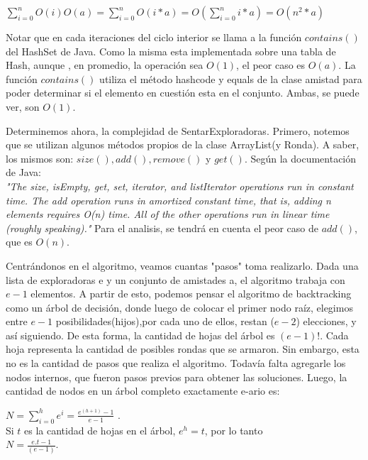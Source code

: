 \documentclass[10pt, a4paper]{article}
\begin{document}
\hspace{30mm}$\sum\limits_{i=0}^n O(i)O(a) =  \sum\limits_{i=0}^n O(i*a) = O(\sum\limits_{i=0}^n i*a) = O(n^2*a)$ 

Notar que en cada iteraciones del ciclo interior se llama a la función $contains()$ del HashSet de Java. Como la misma esta implementada sobre una tabla de Hash, aunque , en promedio, la operación sea $O(1)$, el peor caso es $O(a)$. La función $contains()$ utiliza el método hashcode y equals de la clase amistad para poder determinar si el elemento en cuestión esta en el conjunto. Ambas, se puede ver, son $O(1)$.


Determinemos ahora, la complejidad de SentarExploradoras.
Primero, notemos que se utilizan algunos métodos propios de la clase ArrayList(y Ronda). A saber, los mismos son: $size(),add(),remove()$ y $get()$. Según la documentación de Java:\\

\textit{"The size, isEmpty, get, set, iterator, and listIterator operations run in constant time. The add operation runs in amortized constant time, that is, adding n elements requires O(n) time. All of the other operations run in linear time (roughly speaking)."} Para el analisis, se tendrá en cuenta el peor caso de $add()$, que es $O(n)$.

Centrándonos en el algoritmo, veamos cuantas "pasos" toma realizarlo.  Dada una lista de exploradoras e y un conjunto de amistades a, el algoritmo trabaja con $e-1$ elementos. A partir de esto, podemos pensar el algoritmo de backtracking como un árbol de decisión, donde luego de colocar el primer nodo raíz, elegimos entre $e-1$ posibilidades(hijos),por cada uno de ellos, restan ($e-2$) elecciones, y así siguiendo. De esta forma, la cantidad de hojas del árbol es $(e-1)!$. Cada hoja representa la cantidad de posibles rondas que se armaron. Sin embargo, esta no es la cantidad de pasos que realiza el algoritmo. Todavía falta agregarle los nodos internos, que fueron pasos previos para obtener las soluciones. Luego, la cantidad de nodos en un árbol completo  exactamente e-ario es:

\hspace{60mm}$N = \sum\limits_{i=0}^h e ^i = \frac{e^{(h+1)} -1}{e-1} $ . \\


Si $t$ es la cantidad de hojas en el árbol, $e^{h} = t$, por lo tanto  \\


\hspace{60mm} $N = \frac{e.t -1}{(e-1)}$.
\end{document}
